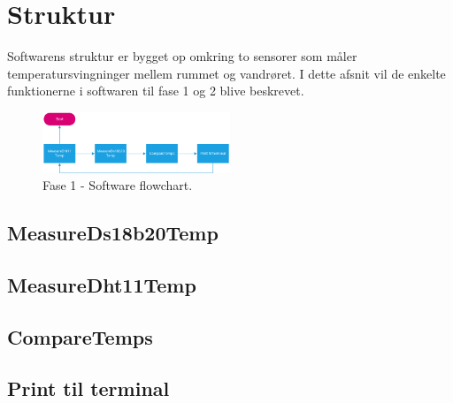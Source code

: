 \section{Struktur}
Softwarens struktur er bygget op omkring to sensorer som måler temperatursvingninger mellem rummet og vandrøret. I dette afsnit vil de enkelte funktionerne i softwaren til fase 1 og 2 blive beskrevet. 
\begin{figure}[h!]
  \centering
  \includegraphics[width=0.5\textwidth]{figures/Fase1software2.png}
  \caption{Fase 1 - Software flowchart.}
\end{figure}


\subsection{MeasureDs18b20Temp}

\subsection{MeasureDht11Temp}
\subsection{CompareTemps}
\subsection{Print til terminal}

